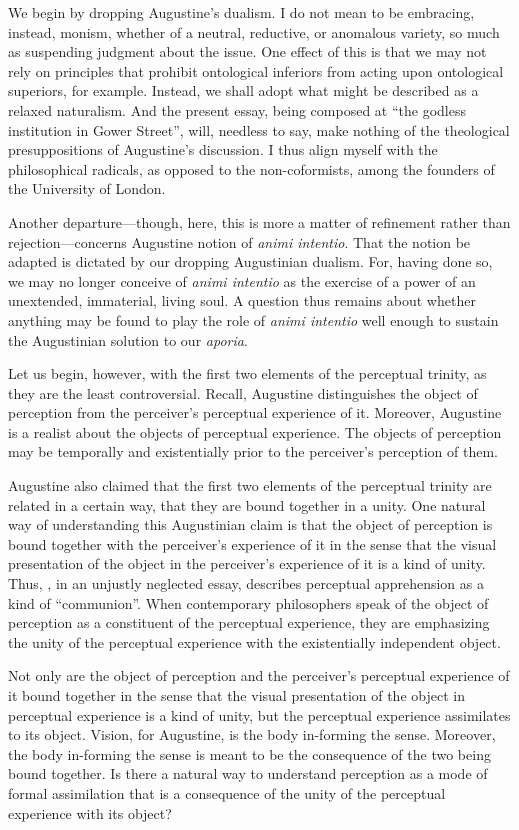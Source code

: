 \documentclass[12pt]{article}
\begin{document}
We begin by dropping Augustine's dualism. I do not mean to be embracing, instead, monism, whether of a neutral, reductive, or anomalous variety, so much as suspending judgment about the issue. One effect of this is that we may not rely on principles that prohibit ontological inferiors from acting upon ontological superiors, for example. Instead, we shall adopt what might be described as a relaxed naturalism. And the present essay, being composed at ``the godless institution in Gower Street'', will, needless to say, make nothing of the theological presuppositions of Augustine's discussion. I thus align myself with the philosophical radicals, as opposed to the non-coformists, among the founders of the University of London.

Another departure---though, here, this is more a matter of refinement rather than rejection---concerns Augustine notion of \emph{animi intentio}. That the notion be adapted is dictated by our dropping Augustinian dualism. For, having done so, we may no longer conceive of \emph{animi intentio} as the exercise of a power of an unextended, immaterial, living soul. A question thus remains about whether anything may be found to play the role of \emph{animi intentio} well enough to sustain the Augustinian solution to our \emph{aporia}.

Let us begin, however, with the first two elements of the perceptual trinity, as they are the least controversial. Recall, Augustine distinguishes the object of perception from the perceiver's perceptual experience of it. Moreover, Augustine is a realist about the objects of perceptual experience. The objects of perception may be temporally and existentially prior to the perceiver's perception of them. 

Augustine also claimed that the first two elements of the perceptual trinity are related in a certain way, that they are bound together in a unity. One natural way of understanding this Augustinian claim is that the object of perception is bound together with the perceiver's experience of it in the sense that the visual presentation of the object in the perceiver's experience of it is a kind of unity. Thus, \citet{Ardley:1958aa}, in an unjustly neglected essay, describes perceptual apprehension as a kind of ``communion''. When contemporary philosophers speak of the object of perception as a constituent of the perceptual experience, they are emphasizing the unity of the perceptual experience with the existentially independent object. 

Not only are the object of perception and the perceiver's perceptual experience of it bound together in the sense that the visual presentation of the object in perceptual experience is a kind of unity, but the perceptual experience assimilates to its object. Vision, for Augustine, is the body in-forming the sense. Moreover, the body in-forming the sense is meant to be the consequence of the two being bound together. Is there a natural way to understand perception as a mode of formal assimilation that is a consequence of the unity of the perceptual experience with its object? 
\end{document}
